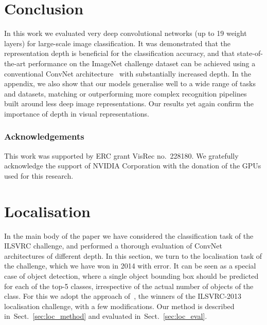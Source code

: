 \documentclass{article} \usepackage{iclr2015,times}
\newcommand{\sref}[1]{Sect.~\ref{#1}}
\begin{document}
\section{Conclusion}
\label{sec:conclusion}
In this work we evaluated very deep convolutional networks (up to 19 weight layers) for large-scale image classification.
It was demonstrated that the representation depth is beneficial for the classification accuracy, and that 
state-of-the-art performance on the ImageNet challenge dataset can be achieved using a conventional ConvNet architecture~\citep{LeCun89,Krizhevsky12}
with substantially increased depth. 
In the appendix, we also show that our models generalise well to a wide range of tasks and datasets, matching or outperforming more complex recognition pipelines built around less deep image representations.
Our results yet again confirm the importance of depth in visual representations.

\subsubsection*{Acknowledgements}
This work was supported by ERC grant VisRec no.\ 228180. 
We gratefully acknowledge the support of NVIDIA Corporation with the donation of the GPUs used for this research.


{
    \small
    \setlength{\bibsep}{3pt}
    
}

\appendix

\section{Localisation}
\label{sec:loc}
In the main body of the paper we have considered the classification task of the ILSVRC challenge, and performed a thorough evaluation of ConvNet architectures of different depth.
In this section, we turn to the localisation task of the challenge, which we have won in 2014 with  error.
It can be seen as a special case of object detection, where a single object bounding box should be predicted for each of the top-5 classes, irrespective of the actual number of objects of the class.
For this we adopt the approach of~\citet{Sermanet14}, the winners of the ILSVRC-2013 localisation challenge, with a few modifications.
Our method is described in~\sref{sec:loc_method} and evaluated in~\sref{sec:loc_eval}.
\end{document}
